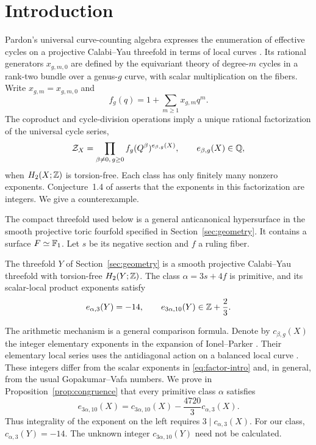 \section{Introduction}

Pardon's universal curve-counting algebra expresses the enumeration
of effective cycles on a projective Calabi--Yau threefold in terms of
local curves \cite{Pardon}. Its rational generators $x_{g,m,0}$ are
defined by the equivariant theory of degree-$m$ cycles in a rank-two
bundle over a genus-$g$ curve, with scalar multiplication on the fibers.
Write $x_{g,m}=x_{g,m,0}$ and
\[
 f_g(q)=1+\sum_{m\ge1}x_{g,m}q^m.
\]
The coproduct and cycle-division operations imply a unique rational
factorization of the universal cycle series,
\begin{equation}\label{eq:factor-intro}
 \mathcal Z_X=\prod_{\beta\ne0,\,g\ge0}f_g(Q^\beta)^{e_{\beta,g}(X)},
 \qquad e_{\beta,g}(X)\in\mathbb Q,
\end{equation}
when $H_2(X;\mathbb Z)$ is torsion-free. Each class has only finitely many
nonzero exponents. Conjecture~1.4 of \cite{Pardon} asserts that the
exponents in this factorization are integers. We give a counterexample.

The compact threefold used below is a general anticanonical
hypersurface in the smooth projective toric fourfold specified in
Section~\ref{sec:geometry}. It contains a surface $F\simeq\mathbb F_1$.
Let $s$ be its negative section and $f$ a ruling fiber.

\begin{theorem}\label{thm:main}
The threefold $Y$ of Section~\ref{sec:geometry} is a smooth projective
Calabi--Yau threefold with torsion-free $H_2(Y;\mathbb Z)$. The class
$\alpha=3s+4f$ is primitive, and its scalar-local product exponents satisfy
\[
 e_{\alpha,3}(Y)=-14,\qquad
 e_{3\alpha,10}(Y)\in\mathbb Z+\frac23.
\]
\end{theorem}

The arithmetic mechanism is a general comparison formula. Denote by
$c_{\beta,g}(X)$ the integer elementary exponents in the expansion of
Ionel--Parker \cite[Theorem 8.1]{IP}. Their elementary local series
uses the antidiagonal action on a balanced local curve
\cite[Proposition 3.3]{IP}. These integers differ from the scalar
exponents in \eqref{eq:factor-intro} and, in general, from the usual
Gopakumar--Vafa numbers. We prove in Proposition~\ref{prop:congruence}
that every primitive class $\alpha$ satisfies
\begin{equation}\label{eq:obstruction-intro}
 e_{3\alpha,10}(X)
 =c_{3\alpha,10}(X)-\frac{4720}{3}c_{\alpha,3}(X).
\end{equation}
Thus integrality of the exponent on the left requires
$3\mid c_{\alpha,3}(X)$. For our class, $c_{\alpha,3}(Y)=-14$.
The unknown integer $c_{3\alpha,10}(Y)$ need not be calculated.

